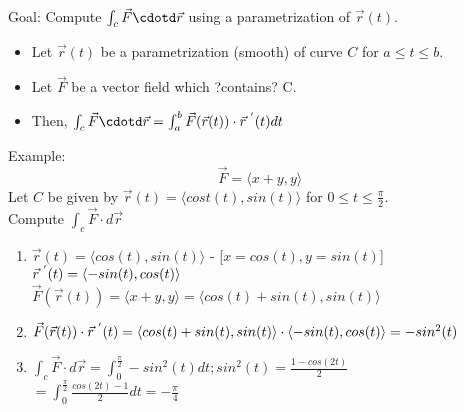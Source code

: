 \documentclass[12pt,letterpaper, onecolumn]{exam}
\begin{document}
		Goal: Compute $\int_c \vec{F}\cdotd\vec{r}$ using a parametrization of $\vec{r}(t)$.\\
		\begin{itemize}
			\item Let $\vec{r}(t)$ be a parametrization (smooth) of curve $C$ for $a\leq t \leq b$.
			\item Let $\vec{F}$ be a vector field which ?contains? C.
			\item Then, $\int_c \vec{F}\cdotd\vec{r}=\int_{a}^{b}\vec{F}(\vec{r}(t))\cdot\vec{r}^{\hspace*{0.1cm}'}(t) dt$
		\end{itemize}
		Example:\\
		$$\vec{F}=\langle x+y,y\rangle$$
		Let $C$ be given by $\vec{r}(t)=\langle cost(t), sin(t)\rangle$ for $0\leq t \leq \frac{\pi}{2}$. \\
		Compute $\int_c \vec{F}\cdot d\vec{r}$
		\begin{enumerate}
			\item $\vec{r}(t)=\langle cos(t),sin(t) \rangle$ - [$x=cos(t),y=sin(t)$]\\
			$\vec{r}^{\hspace*{0.1cm}'}(t)=\langle -sin(t),cos(t) \rangle$\\
			$\vec{F}(\vec{r}(t))=\langle x+y, y \rangle=\langle cos(t)+sin(t),sin(t) \rangle$
			\item $\vec{F}(\vec{r}(t))\cdot\vec{r}^{\hspace*{0.1cm}'}(t)=\langle cos(t)+sin(t),sin(t) \rangle \cdot \langle-sin(t), cos(t)\rangle = -sin^2(t)$
			\item $\int_c \vec{F}\cdot d\vec{r}=\int _{0}^{\frac{\pi}{2}}-sin^2(t) dt; sin^2(t)=\frac{1-cos(2t)}{2}$\\
			$=\int_{0}^{\frac{\pi}{2}}\frac{cos(2t)-1}{2}dt=-\frac{\pi}{4}$
		\end{enumerate}
\end{document}

